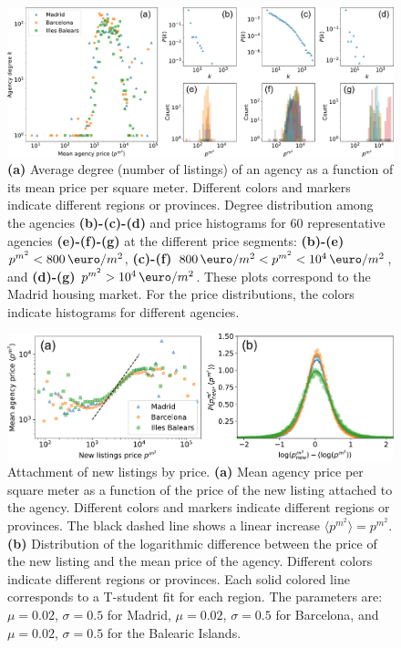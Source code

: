 \begin{figure}
    \label{fig:panel_price}
    \centering
    \includegraphics[width =\textwidth]{Figs/Idealista_dynamics/panel_price.pdf}
	\caption[Price segmentation by the degree.]{\textbf{(a)} Average degree (number of listings) of an agency as a function of its mean price per square meter. Different colors and markers indicate different regions or provinces. Degree distribution among the agencies \textbf{(b)-(c)-(d)} and price histograms for 60 representative agencies \textbf{(e)-(f)-(g)} at the different price segments: \textbf{(b)-(e)} $p^{{m}^2} < 800 \, \textup{\euro} / m^2$, \textbf{(c)-(f)} $800 \, \textup{\euro}  / m^2 < p^{{m}^2} < 10^4 \, \textup{\euro}  / m^2$, and \textbf{(d)-(g)} $p^{{m}^2} > 10^4 \, \textup{\euro}  / m^2$. These plots correspond to the Madrid housing market. For the price distributions, the colors indicate histograms for different agencies.}
\end{figure}

\begin{figure}
    \label{fig:attach_price}
    \centering
    \includegraphics[width =\textwidth]{Figs/Idealista_dynamics/panel_attach_price.pdf}
	\caption[Attachment dynamics of new listings by price.]{Attachment of new listings by price. \textbf{(a)} Mean agency price per square meter as a function of the price of the new listing attached to the agency. Different colors and markers indicate different regions or provinces. The black dashed line shows a linear increase $\langle p^{{m}^2} \rangle = p^{{m}^2}$. \textbf{(b)} Distribution of the logarithmic difference between the price of the new listing and the mean price of the agency. Different colors indicate different regions or provinces. Each solid colored line corresponds to a T-student fit for each region. The parameters are: $\mu = 0.02$, $\sigma = 0.5$ for Madrid, $\mu = 0.02$, $\sigma = 0.5$ for Barcelona, and $\mu = 0.02$, $\sigma = 0.5$ for the Balearic Islands.}
\end{figure}

